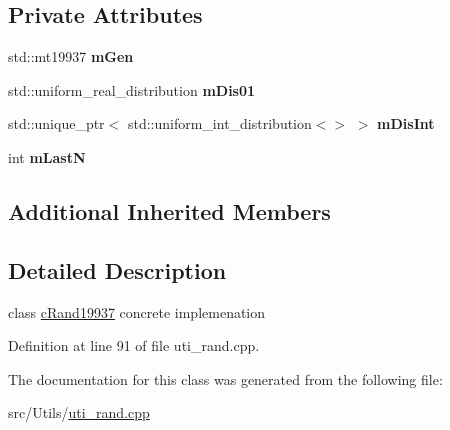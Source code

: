 \subsection*{Private Attributes}
\begin{DoxyCompactItemize}
\item 
std\+::mt19937 {\bfseries m\+Gen}\hypertarget{classMMVII_1_1cRand19937_a72a633558ed9276aad354691575ecdbd}{}\label{classMMVII_1_1cRand19937_a72a633558ed9276aad354691575ecdbd}

\item 
std\+::uniform\+\_\+real\+\_\+distribution {\bfseries m\+Dis01}\hypertarget{classMMVII_1_1cRand19937_aabd4e90a206ee6fdd9da90829ae9a85d}{}\label{classMMVII_1_1cRand19937_aabd4e90a206ee6fdd9da90829ae9a85d}

\item 
std\+::unique\+\_\+ptr$<$ std\+::uniform\+\_\+int\+\_\+distribution$<$$>$ $>$ {\bfseries m\+Dis\+Int}\hypertarget{classMMVII_1_1cRand19937_a62bdcde28e1b47d306e11a5dee854abd}{}\label{classMMVII_1_1cRand19937_a62bdcde28e1b47d306e11a5dee854abd}

\item 
int {\bfseries m\+LastN}\hypertarget{classMMVII_1_1cRand19937_ae0d000bc487044e4b0f657a16078d72f}{}\label{classMMVII_1_1cRand19937_ae0d000bc487044e4b0f657a16078d72f}

\end{DoxyCompactItemize}
\subsection*{Additional Inherited Members}


\subsection{Detailed Description}
class \hyperlink{classMMVII_1_1cRand19937}{c\+Rand19937} concrete implemenation 

Definition at line 91 of file uti\+\_\+rand.\+cpp.



The documentation for this class was generated from the following file\+:\begin{DoxyCompactItemize}
\item 
src/\+Utils/\hyperlink{uti__rand_8cpp}{uti\+\_\+rand.\+cpp}\end{DoxyCompactItemize}
